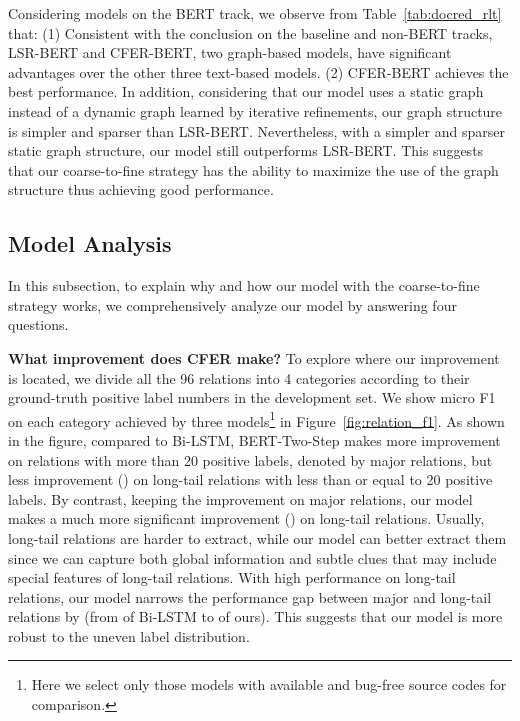 \documentclass[letterpaper]{article} \usepackage{aaai21}  \usepackage{times}  \usepackage{helvet} \usepackage{courier}  \usepackage[hyphens]{url}  \usepackage{graphicx} \urlstyle{rm} \def\UrlFont{\rm}  \usepackage{natbib}  \usepackage{caption} \frenchspacing  \setlength{\pdfpagewidth}{8.5in}  \setlength{\pdfpageheight}{11in}
\begin{document}
Considering models on the BERT track, we observe from Table~\ref{tab:docred_rlt} that: 
(1)
Consistent with the conclusion on the baseline and non-BERT tracks, LSR-BERT and CFER-BERT, two graph-based models, have significant advantages over the other three text-based models. 
(2)
CFER-BERT achieves the best performance. 
In addition, considering that our model uses a static graph instead of a dynamic graph learned by iterative refinements, our graph structure is simpler and sparser than LSR-BERT.
Nevertheless, with a simpler and sparser static graph structure, our model still outperforms LSR-BERT. 
This suggests that our coarse-to-fine strategy has the ability to maximize the use of the graph structure thus achieving good performance. 

\subsection{Model Analysis}
In this subsection, to explain why and how our model with the coarse-to-fine strategy works, we comprehensively analyze our model by answering four questions. 

\noindent\textbf{What improvement does CFER make? }
To explore where our improvement is located, we divide all the 96 relations into 4 categories according to their ground-truth positive label numbers in the development set. 
We show micro F1 on each category achieved by three models\footnote{Here we select only those models with available and bug-free source codes for comparison.} in Figure~\ref{fig:relation_f1}. 
As shown in the figure, compared to Bi-LSTM, BERT-Two-Step makes more improvement on relations with more than 20 positive labels, denoted by major relations, but less improvement () on long-tail relations with less than or equal to 20 positive labels. 
By contrast, keeping the improvement on major relations, our model makes a much more significant improvement () on long-tail relations. 
Usually, long-tail relations are harder to extract, while our model can better extract them since we can capture both global information and subtle clues that may include special features of long-tail relations. 
With high performance on long-tail relations, our model narrows the performance gap between major and long-tail relations by  (from  of Bi-LSTM to  of ours). 
This suggests that our model is more robust to the uneven label distribution. 
\end{document}
